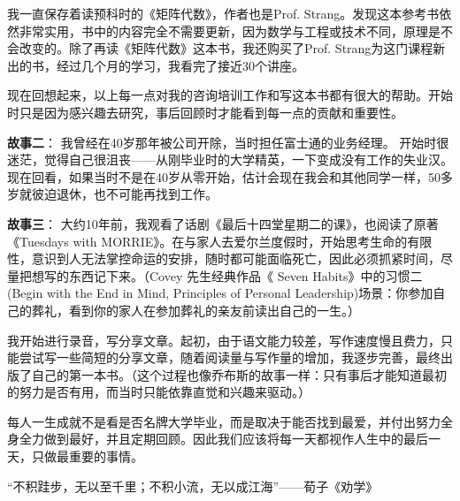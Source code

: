 {\begin{minipage}[t]{0.97\columnwidth}
我一直保存着读预科时的《矩阵代数》，作者也是Prof. Strang。发现这本参考书依然非常实用，书中的内容完全不需要更新，因为数学与工程或技术不同，原理是不会改变的。除了再读《矩阵代数》这本书，我还购买了Prof. Strang为这门课程新出的书，经过几个月的学习，我看完了接近30个讲座。

现在回想起来，以上每一点对我的咨询培训工作和写这本书都有很大的帮助。开始时只是因为感兴趣去研究，事后回顾时才能看到每一点的贡献和重要性。

\begin{description}
\item[]
\begin{description}
\tightlist
\item[]
= = =
\end{description}
\end{description}

\textbf{故事二}：
我曾经在40岁那年被公司开除，当时担任富士通的业务经理。
开始时很迷茫，觉得自己很沮丧——从刚毕业时的大学精英，一下变成没有工作的失业汉。现在回看，如果当时不是在40岁从零开始，估计会现在我会和其他同学一样，50多岁就彼迫退休，也不可能再找到工作。


\begin{description}
\item[]
\begin{description}
\tightlist
\item[]
= = =
\end{description}
\end{description}

\textbf{故事三}：
大约10年前，我观看了话剧《最后十四堂星期二的课》，也阅读了原著《Tuesdays with MORRIE》。在与家人去爱尔兰度假时，开始思考生命的有限性，意识到人无法掌控命运的安排，随时都可能面临死亡，因此必须抓紧时间，尽量把想写的东西记下来。（Covey 先生经典作品《 Seven Habits》中的习惯二(Begin with the End in Mind, Principles of Personal Leadership)场景：你参加自己的葬礼，看到你的家人在参加葬礼的亲友前读出自己的一生。）

我开始进行录音，写分享文章。起初，由于语文能力较差，写作速度慢且费力，只能尝试写一些简短的分享文章，随着阅读量与写作量的增加，我逐步完善，最终出版了自己的第一本书。（这个过程也像乔布斯的故事一样：只有事后才能知道最初的努力是否有用，而当时只能依靠直觉和兴趣来驱动。）

每人一生成就不是看是否名牌大学毕业，而是取决于能否找到最爱，并付出努力全身全力做到最好，并且定期回顾。因此我们应该将每一天都视作人生中的最后一天，只做最重要的事情。

“不积跬步，无以至千里；不积小流，无以成江海”——荀子《劝学》
\strut
\end{minipage}}




